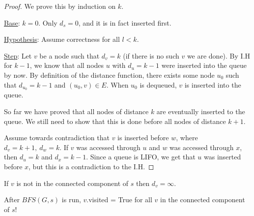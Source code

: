 \begin{proof}
We prove this by induction on $k$. 

\underline{Base}: $k=0$. Only $d_s=0$, and it is in fact inserted first.

\underline{Hypothesis}: Assume correctness for all $l<k$.

\underline{Step}: Let $v$ be a node such that $d_v=k$ (if there is no such $v$ we are done). By I.H for $k-1$, we know that all nodes $u$ with $d_u=k-1$ were inserted into the queue by now. By definition of the distance function, there exists some node $u_0$ such that $d_{u_0}=k-1$ and $(u_0,v)\in E$. When $u_0$ is dequeued, $v$ is inserted into the queue. 

So far we have proved that all nodes of distance $k$ are eventually inserted to the queue. We still need to show that this is done before all nodes of distance $k+1$. 

Assume towards contradiction that $v$ is inserted before $w$, where $d_v=k+1,\ d_w=k$. If $v$ was accessed through $u$ and $w$ was accessed through $x$, then $d_u = k$ and $d_x=k-1$. Since a queue is LIFO, we get that $u$ was inserted before $x$, but this is a contradiction to the I.H.


\end{proof}

\begin{remark}
If $v$ is not in the connected component of $s$ then $d_v=\infty$.
\end{remark}


\begin{corollary}
After $BFS(G,s)$ is run, $v$.visited = True for all $v$ in the connected component of $s$!
\end{corollary}


